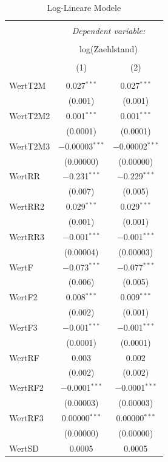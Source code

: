 \documentclass[a4paper,12pt]{thesis}
\begin{document}
	\begin{longtable}{@{\extracolsep{-5pt}}lcc} 
		\caption{Log-Lineare Modele} 
		\label{ZweiModelle}
		\\[-1.8ex]\hline 
		\hline \\[-1.8ex] 
		& \multicolumn{2}{c}{\textit{Dependent variable:}} \\ 
		\cline{2-3} 
		\\[-1.8ex] & \multicolumn{2}{c}{log(Zaehlstand)} \\ 
		\\[-1.8ex] & (1) & (2)\\ 
		\hline \\[-1.8ex] 
		WertT2M & 0.027$^{***}$ & 0.027$^{***}$ \\ 
		& (0.001) & (0.001) \\ 
		WertT2M2 & 0.001$^{***}$ & 0.001$^{***}$ \\ 
		& (0.0001) & (0.0001) \\ 
		WertT2M3 & $-$0.00003$^{***}$ & $-$0.00002$^{***}$ \\ 
		& (0.00000) & (0.00000) \\ 
		WertRR & $-$0.231$^{***}$ & $-$0.229$^{***}$ \\ 
		& (0.007) & (0.005) \\ 
		WertRR2 & 0.029$^{***}$ & 0.029$^{***}$ \\ 
		& (0.001) & (0.001) \\ 
		WertRR3 & $-$0.001$^{***}$ & $-$0.001$^{***}$ \\ 
		& (0.00004) & (0.00003) \\ 
		WertF & $-$0.073$^{***}$ & $-$0.077$^{***}$ \\ 
		& (0.006) & (0.005) \\ 
		WertF2 & 0.008$^{***}$ & 0.009$^{***}$ \\ 
		& (0.002) & (0.001) \\ 
		WertF3 & $-$0.001$^{***}$ & $-$0.001$^{***}$ \\ 
		& (0.0001) & (0.0001) \\ 
		WertRF & 0.003 & 0.002 \\ 
		& (0.002) & (0.002) \\ 
		WertRF2 & $-$0.0001$^{***}$ & $-$0.0001$^{***}$ \\ 
		& (0.00003) & (0.00003) \\ 
		WertRF3 & 0.00000$^{***}$ & 0.00000$^{***}$ \\ 
		& (0.00000) & (0.00000) \\ 
		WertSD & 0.0005 & 0.0005 \\ 

\end{longtable}
\end{document}
